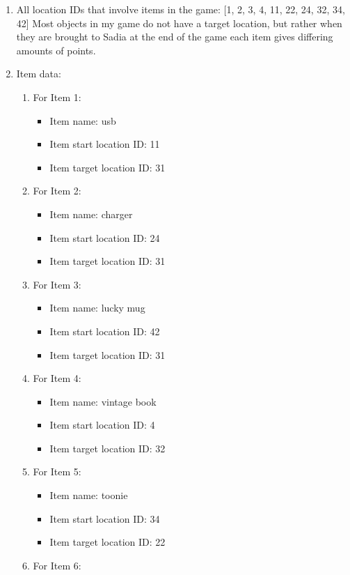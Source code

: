 \documentclass[11pt]{article}
\begin{document}
\begin{enumerate}
\item All location IDs that involve items in the game: [1, 2, 3, 4, 11, 22, 24, 32, 34, 42] \newline
Most objects in my game do not have a target location, but rather when they are brought to Sadia at the end of the game each item gives differing amounts of points.

\item Item data:
\begin{enumerate}
    \item For Item 1:
    \begin{itemize}
    \item Item name: usb
    \item Item start location ID: 11
    \item Item target location ID: 31
    \end{itemize}
        \item For Item 2:
    \begin{itemize}
    \item Item name: charger
    \item Item start location ID: 24
    \item Item target location ID: 31
    \end{itemize}
        \item For Item 3:
    \begin{itemize}
    \item Item name: lucky mug
    \item Item start location ID: 42
    \item Item target location ID: 31
    \end{itemize}
    \item For Item 4:
    \begin{itemize}
    \item Item name: vintage book
    \item Item start location ID: 4
    \item Item target location ID: 32
    \end{itemize}
        \item For Item 5:
    \begin{itemize}
    \item Item name: toonie
    \item Item start location ID: 34
    \item Item target location ID: 22
    \end{itemize}
    \item For Item 6:

\end{enumerate}
\end{enumerate}
\end{document}
